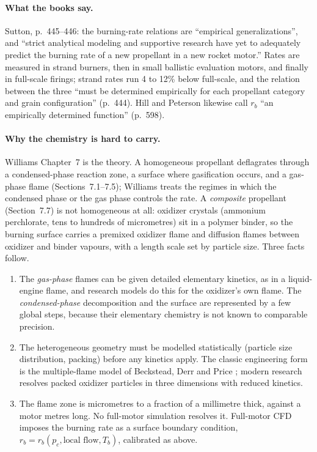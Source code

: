 \paragraph{What the books say.} Sutton, p.~445--446: the burning-rate
relations are ``empirical generalizations'', and ``strict analytical modeling
and supportive research have yet to adequately predict the burning rate of a
new propellant in a new rocket motor.'' Rates are measured in strand
burners, then in small ballistic evaluation motors, and finally in full-scale
firings; strand rates run 4 to 12\% below full-scale, and the relation
between the three ``must be determined empirically for each propellant
category and grain configuration'' (p.~444). Hill and Peterson likewise call
$r_b$ ``an empirically determined function'' (p.~598).

\paragraph{Why the chemistry is hard to carry.} Williams Chapter~7 is the
theory. A homogeneous propellant deflagrates through a condensed-phase
reaction zone, a surface where gasification occurs, and a gas-phase flame
(Sections~7.1--7.5); Williams treats the regimes in which the condensed
phase or the gas phase controls the rate. A \emph{composite} propellant
(Section~7.7) is not homogeneous at all: oxidizer crystals (ammonium
perchlorate, tens to hundreds of micrometres) sit in a polymer binder, so the
burning surface carries a premixed oxidizer flame and diffusion flames
between oxidizer and binder vapours, with a length scale set by particle
size. Three facts follow.
\begin{enumerate}
\item The \emph{gas-phase} flames can be given detailed elementary
kinetics, as in a liquid-engine flame, and research models do this for the
oxidizer's own flame. The \emph{condensed-phase} decomposition and the
surface are represented by a few global steps, because their elementary
chemistry is not known to comparable precision.
\item The heterogeneous geometry must be modelled statistically (particle
size distribution, packing) before any kinetics apply. The classic
engineering form is the multiple-flame model of Beckstead, Derr and Price
\cite{BDP1970}; modern research resolves packed oxidizer particles in
three dimensions with reduced kinetics.
\item The flame zone is micrometres to a fraction of a millimetre thick,
against a motor metres long. No full-motor simulation resolves it.
Full-motor CFD imposes the burning rate as a surface boundary condition,
$r_b=r_b(p_c,\text{local flow},T_b)$, calibrated as above.
\end{enumerate}

